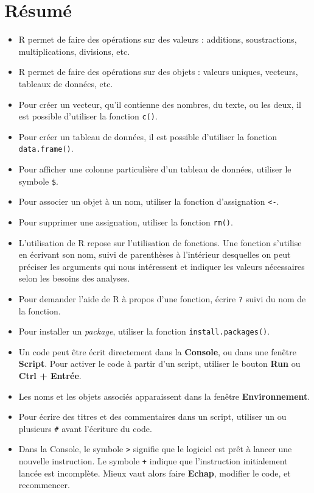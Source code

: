 \documentclass[
]{book}
\providecommand{\tightlist}{%
  \setlength{\itemsep}{0pt}\setlength{\parskip}{0pt}}
\begin{document}
\hypertarget{ruxe9sumuxe9}{%
\section{Résumé}\label{ruxe9sumuxe9}}

\begin{itemize}
\tightlist
\item
  R permet de faire des opérations sur des valeurs : additions, soustractions, multiplications, divisions, etc.
\item
  R permet de faire des opérations sur des objets : valeurs uniques, vecteurs, tableaux de données, etc.
\item
  Pour créer un vecteur, qu'il contienne des nombres, du texte, ou les deux, il est possible d'utiliser la fonction \texttt{c()}.
\item
  Pour créer un tableau de données, il est possible d'utiliser la fonction \texttt{data.frame()}.
\item
  Pour afficher une colonne particulière d'un tableau de données, utiliser le symbole \texttt{\$}.
\item
  Pour associer un objet à un nom, utiliser la fonction d'assignation \texttt{\textless{}-}.
\item
  Pour supprimer une assignation, utiliser la fonction \texttt{rm()}.
\item
  L'utilisation de R repose sur l'utilisation de fonctions. Une fonction s'utilise en écrivant son nom, suivi de parenthèses à l'intérieur desquelles on peut préciser les arguments qui nous intéressent et indiquer les valeurs nécessaires selon les besoins des analyses.
\item
  Pour demander l'aide de R à propos d'une fonction, écrire \texttt{?} suivi du nom de la fonction.
\item
  Pour installer un \emph{package}, utiliser la fonction \texttt{install.packages()}.
\item
  Un code peut être écrit directement dans la \textbf{Console}, ou dans une fenêtre \textbf{Script}. Pour activer le code à partir d'un script, utiliser le bouton \textbf{Run} ou \textbf{Ctrl + Entrée}.
\item
  Les noms et les objets associés apparaissent dans la fenêtre \textbf{Environnement}.
\item
  Pour écrire des titres et des commentaires dans un script, utiliser un ou plusieurs \texttt{\#} avant l'écriture du code.
\item
  Dans la Console, le symbole \texttt{\textgreater{}} signifie que le logiciel est prêt à lancer une nouvelle instruction. Le symbole \texttt{+} indique que l'instruction initialement lancée est incomplète. Mieux vaut alors faire \textbf{Echap}, modifier le code, et recommencer.
\end{itemize}
\end{document}
